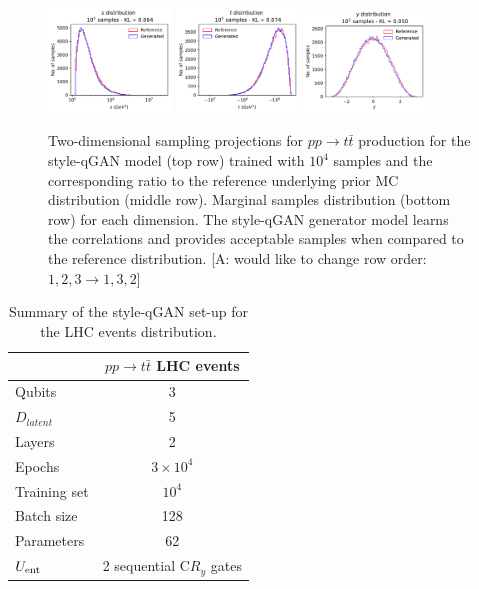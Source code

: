 \documentclass[twocolumn,preprintnumbers,superscriptaddress]{revtex4-2}
\newcommand{\commentAF}[1]{{\color{cyan} {[A: #1]}}}
\begin{document}
\begin{figure}
  \includegraphics[width=0.29\textwidth]{plots/LHCttbar/s-distribution_LHCdata_100k.pdf}%
  \includegraphics[width=0.29\textwidth]{plots/LHCttbar/t-distribution_LHCdata_100k.pdf}%
  \includegraphics[width=0.29\textwidth]{plots/LHCttbar/y-distribution_LHCdata_100k.pdf}

  \caption{\label{fig:ttbar}Two-dimensional sampling projections for $pp
  \rightarrow t\bar{t}$ production for the style-qGAN model (top row) trained
  with $10^4$ samples and the corresponding ratio to the reference underlying
  prior MC distribution (middle row). Marginal samples distribution (bottom row)
  for each dimension. The style-qGAN generator model learns the correlations and
  provides acceptable samples when compared to the reference distribution.
  \commentAF{would like to change row order: $1,2,3 \rightarrow 1,3,2$}}
\end{figure}

\begin{table}
  \begin{tabular}{l|c}
     & {\bf $pp \rightarrow t\bar{t}$ LHC events} \tabularnewline
    \hline
    Qubits & 3  \tabularnewline
    $D_{latent}$ & 5 \tabularnewline
    Layers & 2  \tabularnewline
    Epochs & $3\times10^4$ \tabularnewline
    Training set & $10^4$ \tabularnewline
    Batch size & 128 \tabularnewline
    Parameters & 62 \tabularnewline
    $U_{\rm ent}$ & 2 sequential C$R_y$ gates \tabularnewline
    \hline
  \end{tabular}

  \caption{\label{table:summary_lhc} Summary of the style-qGAN set-up for the LHC events distribution.}
\end{table}
\end{document}
